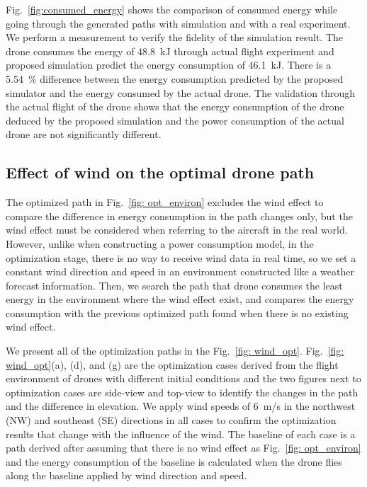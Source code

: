 \documentclass[journal]{./template/IEEEtran}
\begin{document}
Fig.~\ref{fig:consumed_energy} shows the comparison of consumed energy while going through the generated paths with simulation and with a real experiment. We perform a measurement to verify the fidelity of the simulation result.
The drone consumes the energy of 48.8~kJ through actual flight experiment and proposed simulation predict the energy consumption of 46.1~kJ.
There is a 5.54~\% difference between the energy consumption predicted by the proposed simulator and the energy consumed by the actual drone.
The validation through the actual flight of the drone shows that the energy consumption of the drone deduced by the proposed simulation and the power consumption of the actual drone are not significantly different.





\subsection{Effect of wind on the optimal drone path}

The optimized path in Fig.~\ref{fig: opt_environ} excludes the wind effect to compare the difference in energy consumption in the path changes only, but the wind effect must be considered when referring to the aircraft in the real world.
However, unlike when constructing a power consumption model, in the optimization stage, there is no way to receive wind data in real time, so we set a constant wind direction and speed in an environment constructed like a weather forecast information.
Then, we search the path that drone consumes the least energy in the environment where the wind effect exist, and compares the energy consumption with the previous optimized path found when there is no existing wind effect.

We present all of the optimization paths in the Fig.~\ref{fig: wind_opt}. 
Fig.~\ref{fig: wind_opt}(a), (d), and (g) are the optimization cases derived from the flight environment of drones with different initial conditions and the two figures next to optimization cases are side-view and top-view to identify the changes in the path and the difference in elevation. 
We apply wind speeds of 6~m/s in the northwest (NW) and southeast (SE) directions in all cases to confirm the optimization results that change with the influence of the wind.
The baseline of each case is a path derived after assuming that there is no wind effect as Fig.~\ref{fig: opt_environ} and the energy consumption of the baseline is calculated when the drone flies along the baseline applied by wind direction and speed.
\end{document}
